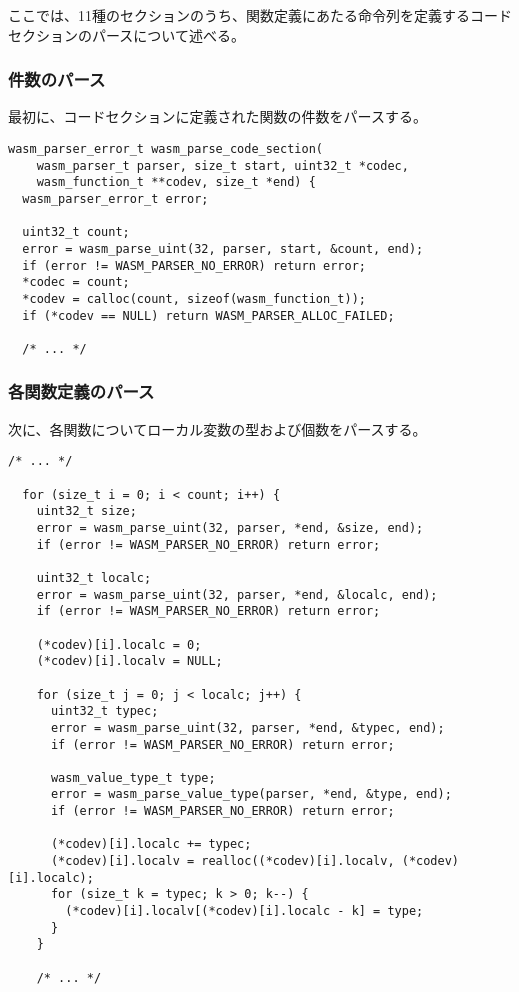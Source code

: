 ここでは、11種のセクションのうち、関数定義にあたる命令列を定義するコードセクションのパースについて述べる。

\subsubsection{件数のパース}

最初に、コードセクションに定義された関数の件数をパースする。

\begin{lstlisting}[caption=コードセクションのパース,label=lst:parse_sleb128]
wasm_parser_error_t wasm_parse_code_section(
    wasm_parser_t parser, size_t start, uint32_t *codec,
    wasm_function_t **codev, size_t *end) {
  wasm_parser_error_t error;

  uint32_t count;
  error = wasm_parse_uint(32, parser, start, &count, end);
  if (error != WASM_PARSER_NO_ERROR) return error;
  *codec = count;
  *codev = calloc(count, sizeof(wasm_function_t));
  if (*codev == NULL) return WASM_PARSER_ALLOC_FAILED;

  /* ... */
\end{lstlisting}

\subsubsection{各関数定義のパース}

次に、各関数についてローカル変数の型および個数をパースする。

\begin{lstlisting}[caption=コードセクションのパース,label=lst:parse_sleb128]
  /* ... */

  for (size_t i = 0; i < count; i++) {
    uint32_t size;
    error = wasm_parse_uint(32, parser, *end, &size, end);
    if (error != WASM_PARSER_NO_ERROR) return error;

    uint32_t localc;
    error = wasm_parse_uint(32, parser, *end, &localc, end);
    if (error != WASM_PARSER_NO_ERROR) return error;

    (*codev)[i].localc = 0;
    (*codev)[i].localv = NULL;

    for (size_t j = 0; j < localc; j++) {
      uint32_t typec;
      error = wasm_parse_uint(32, parser, *end, &typec, end);
      if (error != WASM_PARSER_NO_ERROR) return error;

      wasm_value_type_t type;
      error = wasm_parse_value_type(parser, *end, &type, end);
      if (error != WASM_PARSER_NO_ERROR) return error;

      (*codev)[i].localc += typec;
      (*codev)[i].localv = realloc((*codev)[i].localv, (*codev)[i].localc);
      for (size_t k = typec; k > 0; k--) {
        (*codev)[i].localv[(*codev)[i].localc - k] = type;
      }
    }

    /* ... */
\end{lstlisting}

